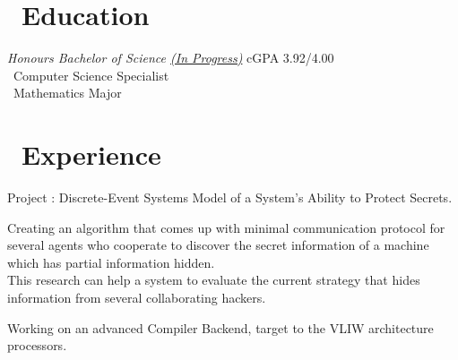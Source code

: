 \documentclass{resume}
\begin{document}




\section{\faGraduationCap\ Education}
\textit{Honours Bachelor of Science \underline{(In Progress)}}  \hfill cGPA 3.92/4.00
\\ \textperiodcentered\  Computer Science Specialist 
\\ \textperiodcentered\  Mathematics Major

\section{\faUsers\ Experience}
 {}
Project : Discrete-Event Systems Model of a System's Ability to Protect Secrets.

Creating an algorithm that comes up with minimal communication protocol 
for several agents who cooperate to discover the secret information of a machine 
which has partial information hidden. \\
This research can help a system to evaluate the current strategy 
that hides information from several collaborating hackers.

 {}
Working on an advanced Compiler Backend, target to the VLIW architecture processors. 




\end{document}
